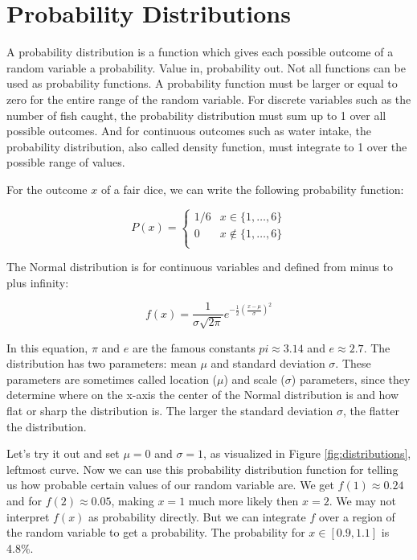 \documentclass[
  10pt,
]{scrbook}
\begin{document}
\hypertarget{probability-distributions}{%
\section{Probability Distributions}\label{probability-distributions}}

A probability distribution is a function which gives each possible outcome of a random variable a probability.
Value in, probability out.
Not all functions can be used as probability functions.
A probability function must be larger or equal to zero for the entire range of the random variable.
For discrete variables such as the number of fish caught, the probability distribution must sum up to 1 over all possible outcomes.
And for continuous outcomes such as water intake, the probability distribution, also called density function, must integrate to 1 over the possible range of values.

For the outcome \(x\) of a fair dice, we can write the following probability function:

\[
P(x) = 
\begin{cases}
 1/6 & x \in \{1, \ldots, 6\} \\
 0 & x \notin \{1, \ldots, 6\} \\
\end{cases}
\]

The Normal distribution is for continuous variables and defined from minus to plus infinity:

\[f(x) = \frac{1}{\sigma \sqrt{2\pi}} e^{-\frac{1}{2}\left(\frac{x-\mu}{\sigma}\right)^2}\]

In this equation, \(\pi\) and \(e\) are the famous constants \(pi \approx 3.14\) and \(e \approx 2.7\).
The distribution has two parameters: mean \(\mu\) and standard deviation \(\sigma\).
These parameters are sometimes called location (\(\mu\)) and scale (\(\sigma\)) parameters, since they determine where on the x-axis the center of the Normal distribution is and how flat or sharp the distribution is.
The larger the standard deviation \(\sigma\), the flatter the distribution.

Let's try it out and set \(\mu = 0\) and \(\sigma = 1\), as visualized in Figure \ref{fig:distributions}, leftmost curve.
Now we can use this probability distribution function for telling us how probable certain values of our random variable are.
We get \(f(1) \approx 0.24\) and for \(f(2) \approx 0.05\), making \(x=1\) much more likely then \(x=2\).
We may not interpret \(f(x)\) as probability directly.
But we can integrate \(f\) over a region of the random variable to get a probability.
The probability for \(x \in [0.9, 1.1]\) is 4.8\%.
\end{document}
